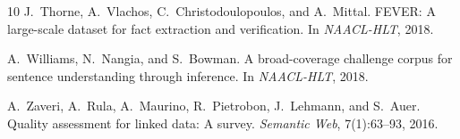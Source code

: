 \documentclass[11pt]{article}
\begin{document}
\begin{thebibliography}{10}
J.~Thorne, A.~Vlachos, C.~Christodoulopoulos, and A.~Mittal.
\newblock FEVER: A large-scale dataset for fact extraction and verification.
\newblock In \emph{NAACL-HLT}, 2018.

A.~Williams, N.~Nangia, and S.~Bowman.
\newblock A broad-coverage challenge corpus for sentence understanding through inference.
\newblock In \emph{NAACL-HLT}, 2018.

A.~Zaveri, A.~Rula, A.~Maurino, R.~Pietrobon, J.~Lehmann, and S.~Auer.
\newblock Quality assessment for linked data: A survey.
\newblock \emph{Semantic Web}, 7(1):63--93, 2016.

\end{thebibliography}
\end{document}
